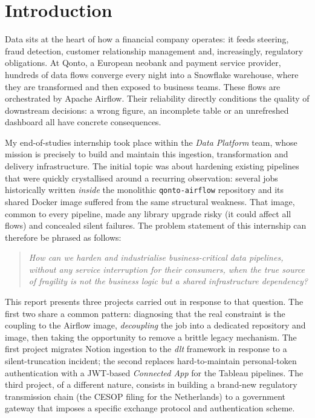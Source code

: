 \chapter*{Introduction}

Data sits at the heart of how a financial company operates: it feeds steering, fraud detection, customer relationship management and, increasingly, regulatory obligations. At Qonto, a European neobank and payment service provider, hundreds of data flows converge every night into a Snowflake warehouse, where they are transformed and then exposed to business teams. These flows are orchestrated by Apache Airflow. Their reliability directly conditions the quality of downstream decisions: a wrong figure, an incomplete table or an unrefreshed dashboard all have concrete consequences.

My end-of-studies internship took place within the \emph{Data Platform} team, whose mission is precisely to build and maintain this ingestion, transformation and delivery infrastructure. The initial topic was about hardening existing pipelines that were quickly crystallised around a recurring observation: several jobs historically written \emph{inside} the monolithic \texttt{qonto-airflow} repository and its shared Docker image suffered from the same structural weakness. That image, common to every pipeline, made any library upgrade risky (it could affect all flows) and concealed silent failures. The problem statement of this internship can therefore be phrased as follows:

\begin{quote}
\itshape How can we harden and industrialise business-critical data pipelines, without any service interruption for their consumers, when the true source of fragility is not the business logic but a shared infrastructure dependency?
\end{quote}

This report presents three projects carried out in response to that question. The first two share a common pattern: diagnosing that the real constraint is the coupling to the Airflow image, \emph{decoupling} the job into a dedicated repository and image, then taking the opportunity to remove a brittle legacy mechanism. The first project migrates Notion ingestion to the \emph{dlt} framework in response to a silent-truncation incident; the second replaces hard-to-maintain personal-token authentication with a JWT-based \emph{Connected App} for the Tableau pipelines. The third project, of a different nature, consists in building a brand-new regulatory transmission chain (the CESOP filing for the Netherlands) to a government gateway that imposes a specific exchange protocol and authentication scheme.


